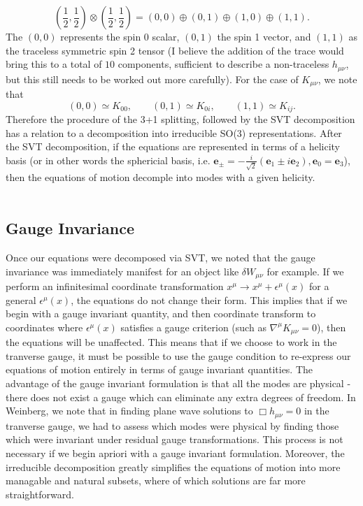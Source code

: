 \documentclass[10pt,letterpaper]{article}
\numberwithin{equation}{subsection}
\begin{document}
\begin{equation}
\left( \frac12,\frac 12\right )\otimes \left( \frac12,\frac 12\right ) = (0,0)\oplus (0,1)\oplus(1,0) \oplus(1,1).
\end{equation}
The $(0,0)$ represents the spin 0 scalar, $(0,1)$ the spin 1 vector, and $(1,1)$ as the traceless symmetric spin 2 tensor (I believe the addition of the trace would bring this to a total of $10$ components, sufficient to describe a non-traceless $h_{\mu\nu}$, but this still needs to be worked out more carefully). For the case of $K_{\mu\nu}$, we note that 
\begin{equation}
(0,0)\simeq K_{00},\qquad (0,1) \simeq K_{0i},\qquad (1,1)\simeq K_{ij}.
\end{equation}
Therefore the procedure of the 3+1 splitting, followed by the SVT decomposition has a relation to a decomposition into irreducible SO(3) representations. After the SVT decomposition, if the equations are represented in terms of a helicity basis (or in other words the sphericial basis, i.e. $\mathbf e_\pm = -\frac{i}{\sqrt 2}(\mathbf e_1 \pm i \mathbf e_2), \mathbf e_0 = \mathbf e_3$), then the equations of motion decomple into modes with a given helicity. 
\\ \\
\subsection{Gauge Invariance}
Once our equations were decomposed via SVT, we noted that the gauge invariance was immediately manifest for an object like $\delta W_{\mu\nu}$ for example. If we perform an infinitesimal coordinate transformation $x^\mu \to x^\mu + \epsilon^\mu(x)$ for a general $\epsilon^{\mu}(x)$, the equations do not change their form. This implies that if we begin with a gauge invariant quantity, and then coordinate transform to coordinates where $\epsilon^{\mu}(x)$ satisfies a gauge criterion (such as $\nabla^\mu K_{\mu\nu} = 0$), then the equations will be unaffected. This means that if we choose to work in the tranverse gauge, it must be possible to use the gauge condition to re-express our equations of motion entirely in terms of gauge invariant quantities. The advantage of the gauge invariant formulation is that all the modes are physical - there does not exist a gauge which can eliminate any extra degrees of freedom. In Weinberg, we note that in finding plane wave solutions to $\Box h_{\mu\nu} =0$ in the tranverse gauge, we had to assess which modes were physical by finding those which were invariant under residual gauge transformations. This process is not necessary if we begin apriori with a gauge invariant formulation. Moreover, the irreducible decomposition greatly simplifies the equations of motion into more managable and natural subsets, where of which solutions are far more straightforward.
\end{document}

